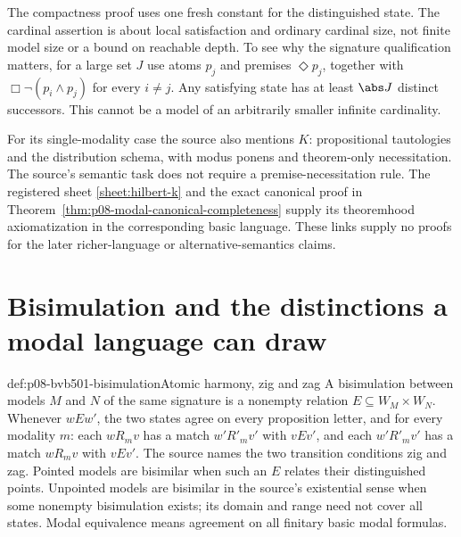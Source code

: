 The compactness proof uses one fresh constant for the distinguished state.
The cardinal assertion is about local satisfaction and ordinary cardinal
size, not finite model size or a bound on reachable depth. To see why the
signature qualification matters, for a large set \(J\) use atoms \(p_j\)
and premises \(\Diamond p_j\), together with
\(\Box\neg(p_i\land p_j)\) for every \(i\ne j\).
Any satisfying state has at least \(\abs J\) distinct successors.
This cannot be a model of an arbitrarily smaller infinite cardinality.

For its single-modality case the source also mentions \(K\): propositional tautologies and the
distribution schema, with modus ponens and theorem-only necessitation.
The source's semantic task does not require a premise-necessitation rule.
The registered sheet \ref{sheet:hilbert-k} and the exact canonical proof in
Theorem~\ref{thm:p08-modal-canonical-completeness} supply its theoremhood
axiomatization in the corresponding basic language. These links supply no
proofs for the later richer-language or alternative-semantics claims.

\section{Bisimulation and the distinctions a modal language can draw}
\label{sec:p08-bvb501-bisimulation}

\begin{hbdefinition}{def:p08-bvb501-bisimulation}{Atomic harmony, zig and zag}
A bisimulation between models \(M\) and \(N\) of the same signature is
a nonempty relation \(E\subseteq W_M\times W_N\). Whenever \(wEw'\),
the two states agree on every proposition letter, and for every modality
\(m\): each \(wR_mv\) has a match \(w'R'_mv'\) with \(vEv'\),
and each \(w'R'_mv'\) has a match \(wR_mv\) with \(vEv'\).
The source names the two transition conditions zig and zag. Pointed models
are bisimilar when such an \(E\) relates their distinguished points.
Unpointed models are bisimilar in the source's existential sense when some
nonempty bisimulation exists; its domain and range need not cover all states.
Modal equivalence means agreement on all finitary basic modal formulas.
\end{hbdefinition}


